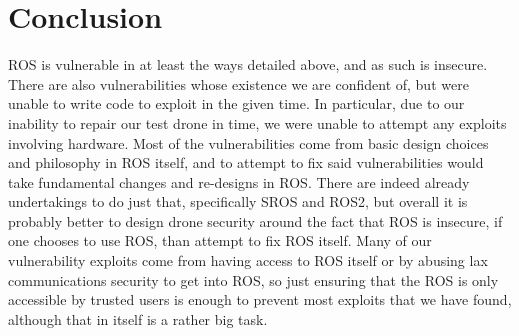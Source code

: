 \documentclass[IEEEtran,letterpaper,10pt,notitlepage,draftclsnofoot,onecolumn]{article}
\begin{document}
\section{Conclusion}
ROS is vulnerable in at least the ways detailed above, and as such is insecure.
There are also vulnerabilities whose existence we are confident of, but were unable to write code to exploit in the given time.
In particular, due to our inability to repair our test drone in time, we were unable to attempt any exploits involving hardware.
Most of the vulnerabilities come from basic design choices and philosophy in ROS itself, and to attempt to fix said vulnerabilities would take fundamental changes and re-designs in ROS.
There are indeed already undertakings to do just that, specifically SROS and ROS2, but overall it is probably better to design drone security around the fact that ROS is insecure, if one chooses to use ROS, than attempt to fix ROS itself.
Many of our vulnerability exploits come from having access to ROS itself or by abusing lax communications security to get into ROS, so just ensuring that the ROS is only accessible by trusted users is enough to prevent most exploits that we have found, although that in itself is a rather big task.



\end{document}
